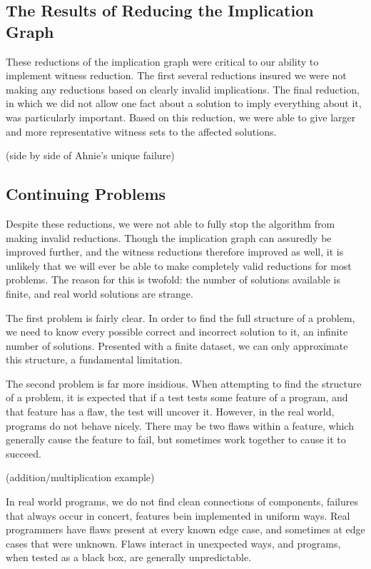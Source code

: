 \documentclass[11pt]{article}
\begin{document}
\subsection{The Results  of Reducing the Implication Graph}

These reductions of the implication graph were critical to our ability to implement witness reduction. The first several reductions insured we were not making any reductions based on clearly invalid implications. The final reduction, in which we did not allow one fact about a solution to imply everything about it, was particularly important. Based on this reduction, we were able to give larger and more representative witness sets to the affected solutions.

(side by side of Ahnie's unique failure)

\subsection{Continuing Problems}

Despite these reductions, we were not able to fully stop the algorithm from making invalid reductions. Though the implication graph can assuredly be improved further, and the witness reductions therefore improved as well, it is unlikely that we will ever be able to make completely valid reductions for most problems. The reason for this is twofold: the number of solutions available is finite, and  real world solutions are strange.

The first problem is fairly clear. In order to find the full structure of a problem, we need to know every possible correct and incorrect solution to it, an infinite  number of solutions. Presented with a finite dataset, we can only approximate this structure, a fundamental limitation.

The second problem is far more insidious. When attempting to find the structure of a problem, it is expected that if a test tests some feature of a program, and that feature has a flaw, the test will uncover it. However, in the real world, programs do not behave nicely. There may be two flaws within a feature, which generally cause the feature to fail, but sometimes work together to cause it to succeed.

(addition/multiplication example)

In real world programs, we do not find clean connections of components, failures that always occur in concert, features bein implemented in uniform ways. Real programmers have flaws present at every known edge case, and sometimes at edge cases that were unknown. Flaws interact in unexpected ways, and programs, when tested as a black box, are generally unpredictable.
\end{document}
